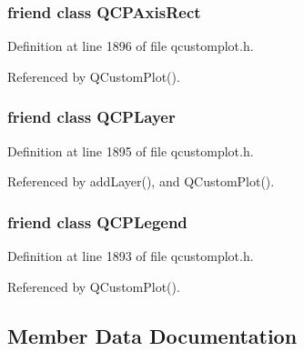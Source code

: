 \subsubsection[{Q\+C\+P\+Axis\+Rect}]{\setlength{\rightskip}{0pt plus 5cm}friend class {\bf Q\+C\+P\+Axis\+Rect}\hspace{0.3cm}{\ttfamily [friend]}}\label{class_q_custom_plot_acbf20ecb140f66c5fd1bc64ae0762990}


Definition at line 1896 of file qcustomplot.\+h.



Referenced by Q\+Custom\+Plot().

\hypertarget{class_q_custom_plot_a5dbf96bf7664c1b6fce49063eeea6eef}{}
\subsubsection[{Q\+C\+P\+Layer}]{\setlength{\rightskip}{0pt plus 5cm}friend class {\bf Q\+C\+P\+Layer}\hspace{0.3cm}{\ttfamily [friend]}}\label{class_q_custom_plot_a5dbf96bf7664c1b6fce49063eeea6eef}


Definition at line 1895 of file qcustomplot.\+h.



Referenced by add\+Layer(), and Q\+Custom\+Plot().

\hypertarget{class_q_custom_plot_a8429035e7adfbd7f05805a6530ad5e3b}{}
\subsubsection[{Q\+C\+P\+Legend}]{\setlength{\rightskip}{0pt plus 5cm}friend class {\bf Q\+C\+P\+Legend}\hspace{0.3cm}{\ttfamily [friend]}}\label{class_q_custom_plot_a8429035e7adfbd7f05805a6530ad5e3b}


Definition at line 1893 of file qcustomplot.\+h.



Referenced by Q\+Custom\+Plot().



\subsection{Member Data Documentation}
\hypertarget{class_q_custom_plot_a4eadcd237dc6a09938b68b16877fa6af}{}
